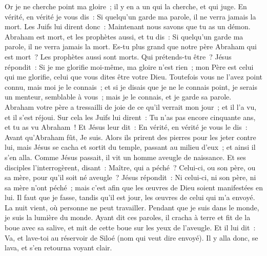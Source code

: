 \begin{multicols}{2}
Or je ne cherche point ma gloire~; il y en a un qui la cherche, et qui juge.
En vérité, en vérité je vous dis~: Si quelqu'un garde ma parole, il ne verra jamais la mort.
Les Juifs lui dirent donc~: Maintenant nous savons que tu as un démon. Abraham est mort, et les prophètes aussi, et tu dis~: Si quelqu'un garde ma parole, il ne verra jamais la mort.
Es-tu plus grand que notre père Abraham qui est mort~? Les prophètes aussi sont morts. Qui prétends-tu être~?
Jésus répondit~: Si je me glorifie moi-même, ma gloire n'est rien~; mon Père est celui qui me glorifie, celui que vous dites être votre Dieu.
Toutefois vous ne l'avez point connu, mais moi je le connais~; et si je disais que je ne le connais point, je serais un menteur, semblable à vous~; mais je le connais, et je garde sa parole.
Abraham votre père a tressailli de joie de ce qu'il verrait mon jour~; et il l'a vu, et il s'est réjoui.
Sur cela les Juifs lui dirent~: Tu n'as pas encore cinquante ans, et tu as vu Abraham~!
Et Jésus leur dit~: En vérité, en vérité je vous le dis~: Avant qu'Abraham fût, Je suis.
Alors ils prirent des pierres pour les jeter contre lui, mais Jésus se cacha et sortit du temple, passant au milieu d'eux~; et ainsi il s'en alla.
\VerseOne{}Comme Jésus passait, il vit un homme aveugle de naissance.
Et ses disciples l'interrogèrent, disant~: Maître, qui a péché~? Celui-ci, ou son père, ou sa mère, pour qu'il soit né aveugle~?
Jésus répondit~: Ni celui-ci, ni son père, ni sa mère n'ont péché~; mais c'est afin que les œuvres de Dieu soient manifestées en lui.
Il faut que je fasse, tandis qu'il est jour, les œuvres de celui qui m'a envoyé. La nuit vient, où personne ne peut travailler.
Pendant que je suis dans le monde, je suis la lumière du monde.
Ayant dit ces paroles, il cracha à terre et fit de la boue avec sa salive, et mit de cette boue sur les yeux de l'aveugle.
Et il lui dit~: Va, et lave-toi au réservoir de Siloé (nom qui veut dire envoyé). Il y alla donc, se lava, et s'en retourna voyant clair.

\end{multicols}
